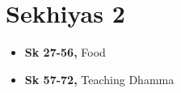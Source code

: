 \chapter{Sekhiyas 2}

\begin{itemize}
\tightlist
\item
  \textbf{Sk 27-56,} Food
\item
  \textbf{Sk 57-72,} Teaching Dhamma
\end{itemize}

